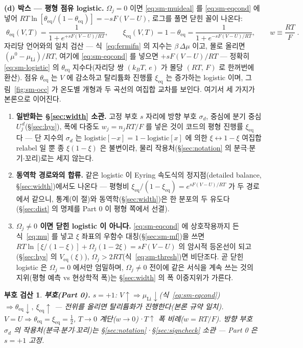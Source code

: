 \documentclass[11pt,a4paper]{article}
\newtheorem*{signbox}{부호 검산}
\newcommand{\eq}{\mathrm{eq}}
\begin{document}
\textbf{(d) 박스 --- 평형 점유 logistic.} $\Omega_j=0$ 이면 \eqref{eq:sm-muideal} 를 \eqref{eq:sm-eqcond} 에
넣어 $RT\ln[\theta_\eq/(1-\theta_\eq)]=-sF(V-U)$, 로그를 풀면 닫힌 꼴이 나온다:
\begin{equation}
\boxed{\;\theta_\eq(V,T)=\frac{1}{1+e^{+sF(V-U)/RT}},\qquad
\xi_\eq(V,T)=1-\theta_\eq=\frac{1}{1+e^{-sF(V-U)/RT}},\qquad
w\equiv\frac{RT}{F}\;.}
\label{eq:sm-logistic}
\end{equation}
자리당 언어와의 일치 검산 --- 식~\eqref{eq:fermifn} 의 지수는 $\beta\,\Delta\mu$ 이고, 몰로 올리면
$(\mu^0-\mu_\mathrm{Li})/RT$, 여기에 \eqref{eq:sm-eqcond} 를 넣으면 $+sF(V-U)/RT$ --- 정확히
\eqref{eq:sm-logistic} 의 $\theta_\eq$ 지수다(자리당 쌍 $(k_BT,\,e)$ 가 몰당 $(RT,\,F)$ 로 한꺼번에 환산).
점유 $\theta_\eq$ 는 $V$ 에 감소하고 탈리튬화 진행률 $\xi_\eq$ 는 증가하는 logistic 이며,
그림~\ref{fig:sm-occ} 가 온도별 개형과 두 곡선의 여집합 교차를 보인다. 여기서 세 가지가 본론으로 이어진다.
\begin{enumerate}[label=(\roman*),leftmargin=2.2em,itemsep=1pt]
\item \textbf{일반화는 \S\ref{sec:width} 소관.} 고정 부호 $s$ 자리에 방향 부호 $\sigma_d$, 중심에 분기 중심
$U_j^{\,d}$(\S\ref{sec:hys}), 폭에 다중도 $w_j=n_jRT/F$ 를 넣은 것이 코드의 평형 진행률 $\xi_\eq$ 다 --- 단 지수의
$\sigma_d$ 는 $\mathrm{logistic}[-x]=1-\mathrm{logistic}[x]$ 에 의한 $\xi\leftrightarrow1-\xi$ 여집합
relabel 일 뿐 종 $\xi(1-\xi)$ 은 불변이라, 물리 작용처(\S\ref{sec:notation} 의 분극$\cdot$분기$\cdot$꼬리)로는
세지 않는다.
\item \textbf{동역학 경로와의 합류.} 같은 logistic 이 Eyring 속도식의 정지점(detailed balance,
\S\ref{sec:width})에서도 나온다 --- 평형비 $\xi_\eq/(1-\xi_\eq)=e^{sF(V-U)/RT}$ 가 두 경로에서 같으니,
통계(이 절)와 동역학(\S\ref{sec:width})은 한 분포의 두 유도다(\S\ref{sec:dist} 의 명제를 Part 0 이 평형
쪽에서 선결).
\item \textbf{$\Omega_j\ne0$ 이면 닫힌 logistic 이 아니다.} \eqref{eq:sm-eqcond} 에 상호작용까지 든
식~\eqref{eq:mu} 를 넣고 $\xi$ 좌표의 우함수 대칭(\S\ref{sec:sm-mf})을 쓰면
$RT\ln[\xi/(1-\xi)]+\Omega_j(1-2\xi)=sF(V-U)$ 의 암시적 등온선이 되고(\S\ref{sec:hys} 의 $V_\eq(\xi)$),
$\Omega_j>2RT$(식~\eqref{eq:sm-thresh})면 비단조다. 곧 닫힌 logistic 은 $\Omega_j=0$ 에서만 엄밀하며,
$\Omega_j\ne0$ 전이에 같은 서식을 계속 쓰는 것의 지위(평형 예측 vs 현상학적 폭)는 \S\ref{sec:width} 의
폭 이중지위가 가른다.
\end{enumerate}

\begin{signbox}
\textbf{부호(Part 0).} $s=+1$: $V\!\uparrow\Rightarrow\mu_\mathrm{Li}\!\downarrow$(식~\eqref{eq:sm-eqcond})
$\Rightarrow\theta_\eq\!\downarrow,\ \xi_\eq\!\uparrow$ --- 전위를 올리면 탈리튬화가 진행한다(본론 규약 일치).
$V=U\Rightarrow\theta_\eq=\xi_\eq=\tfrac12$, $T\to0$ 계단($w\to0$)·$T\!\uparrow$ 폭 비례($w=RT/F$).
방향 부호 $\sigma_d$ 의 작용처(분극$\cdot$분기$\cdot$꼬리)는 \S\ref{sec:notation}·\S\ref{sec:signcheck} 소관 --- Part 0 은 $s=+1$ 고정.
\end{signbox}
\end{document}
